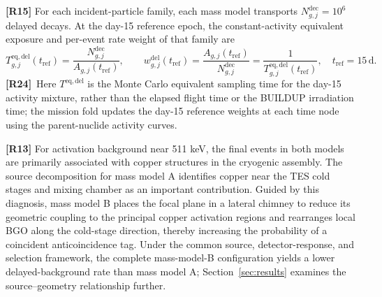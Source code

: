 \documentclass[11pt]{article}
\newcommand{\revmark}[1]{\textcolor{revisionblue}{\textbf{[R#1]}}\ }
\begin{document}
\begingroup
\color{revisionblue}
\noindent\textbf{[R15]} For each incident-particle family, each mass model
transports $N^{\mathrm{dec}}_{g,j}=10^6$ delayed decays. At the day-15 reference
epoch, the constant-activity equivalent exposure and per-event rate weight of
that family are
\begin{equation}
 T^{\mathrm{eq,del}}_{g,j}(t_{\mathrm{ref}})
 =\frac{N^{\mathrm{dec}}_{g,j}}{A_{g,j}(t_{\mathrm{ref}})},
 \qquad
 w^{\mathrm{del}}_{g,j}(t_{\mathrm{ref}})
 =\frac{A_{g,j}(t_{\mathrm{ref}})}{N^{\mathrm{dec}}_{g,j}}
 =\frac{1}{T^{\mathrm{eq,del}}_{g,j}(t_{\mathrm{ref}})},
 \quad t_{\mathrm{ref}}=15\,\mathrm{d}.
 \label{eq:delayed_equivalent_exposure}
\end{equation}
\revmark{24}Here $T^{\mathrm{eq,del}}$ is the Monte Carlo equivalent sampling time for the
day-15 activity mixture, rather than the elapsed flight time or the BUILDUP
irradiation time; the mission fold updates the day-15 reference weights at each
time node using the parent-nuclide activity curves.
\endgroup

\begingroup
\color{revisionblue}
\noindent\textbf{[R13]} For activation background near 511 keV, the final
events in both models are primarily associated with copper structures in the
cryogenic assembly. The source decomposition for mass model A identifies
copper near the TES cold stages and mixing chamber as an important
contribution. Guided by this diagnosis, mass model B places the focal plane in
a lateral chimney to reduce its geometric coupling to the principal copper
activation regions and rearranges local BGO along the cold-stage direction,
thereby increasing the probability of a coincident anticoincidence tag. Under
the common source, detector-response, and selection framework, the complete
mass-model-B configuration yields a lower delayed-background rate than mass
model A; Section~\ref{sec:results} examines the source--geometry relationship
further.
\endgroup
\end{document}
